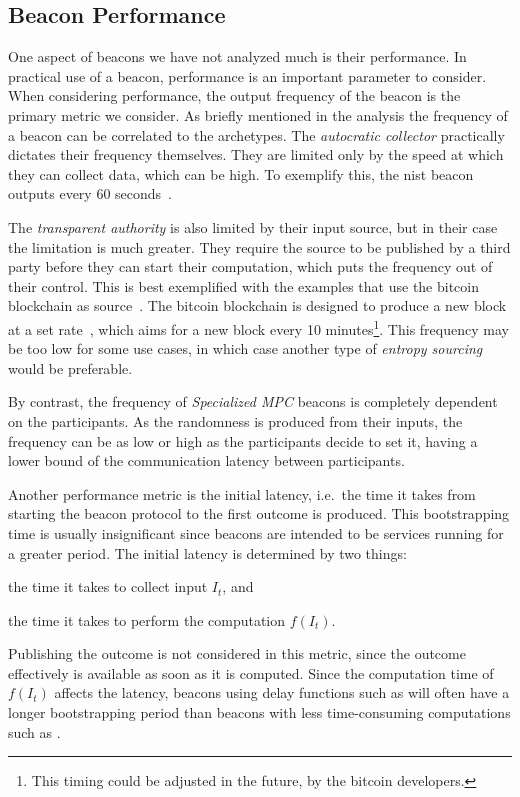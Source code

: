 \subsection{Beacon Performance}
One aspect of beacons we have not analyzed much is their performance.
In practical use of a beacon, performance is an important parameter to consider.
When considering performance, the output frequency of the beacon is the primary metric we consider.
As briefly mentioned in the analysis the frequency of a beacon can be correlated to the archetypes.
The \emph{autocratic collector} practically dictates their frequency themselves.
They are limited only by the speed at which they can collect data, which can be high.
To exemplify this, the \gls{nist} beacon outputs every 60 seconds~\cite{nistbeacon}.

The \emph{transparent authority} is also limited by their input source, but in their case the limitation is much greater.
They require the source to be published by a third party before they can start their computation, which puts the frequency out of their control.
This is best exemplified with the examples that use the bitcoin blockchain as source~\cite{bonneau2015bitcoin, bentov2016bitcoin, bunz2017proofsof}.
The bitcoin blockchain is designed to produce a new block at a set rate~\cite{nakamoto2008bitcoin}, which aims for a new block every 10 minutes\footnote{This timing could be adjusted in the future, by the bitcoin developers.}.
This frequency may be too low for some use cases, in which case another type of \emph{entropy sourcing} would be preferable.

By contrast, the frequency of \emph{Specialized MPC} beacons is completely dependent on the participants.
As the randomness is produced from their inputs, the frequency can be as low or high as the participants decide to set it, having a lower bound of the communication latency between participants.

Another performance metric is the initial latency, i.e.\ the time it takes from starting the beacon protocol to the first outcome is produced.
This bootstrapping time is usually insignificant since beacons are intended to be services running for a greater period.
The initial latency is determined by two things:
\begin{eromanate*}
    \item the time it takes to collect input $I_t$, and
    \item the time it takes to perform the computation $f(I_t)$.
\end{eromanate*}
Publishing the outcome is not considered in this metric, since the outcome effectively is available as soon as it is computed.
Since the computation time of $f(I_t)$ affects the latency, beacons using delay functions such as  will often have a longer bootstrapping period than beacons with less time-consuming computations such as .

